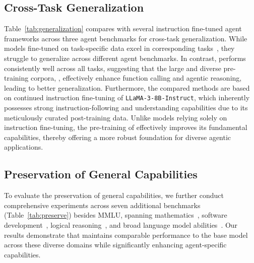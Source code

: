 \subsection{Cross-Task Generalization}
Table~\ref{tab:generalization} compares \method with several instruction fine-tuned agent frameworks across three agent benchmarks for cross-task generalization.
While models fine-tuned on task-specific data excel in corresponding tasks~\cite{groq,zeng2023agenttuning,liu2024toolace}, they struggle to generalize across different agent benchmarks.
In contrast, \method performs consistently well across all tasks, suggesting that the large and diverse pre-training corpora, \dataset, effectively enhance function calling and agentic reasoning, leading to better generalization. 
Furthermore, the compared methods are based on continued instruction fine-tuning of \texttt{LLaMA-3-8B-Instruct}, which inherently possesses strong instruction-following and understanding capabilities due to its meticulously curated post-training data. 
Unlike models relying solely on instruction fine-tuning, the pre-training of \method effectively improves its fundamental capabilities, thereby offering a more robust foundation for diverse agentic applications.


\subsection{Preservation of General Capabilities}
To evaluate the preservation of general capabilities, we further conduct comprehensive experiments across seven additional benchmarks (Table~\ref{tab:preserve}) besides MMLU, spanning mathematics~\cite{cobbe2021training}, software development~\cite{chen2021evaluating,liu2024your}, logical reasoning~\cite{suzgun2022challenging}, and broad language model abilities~\cite{zhou2023instruction,zellers2019hellaswag,hendrycks2020measuring}. Our results demonstrate that \method maintains comparable performance to the base model across these diverse domains while significantly enhancing agent-specific capabilities.

